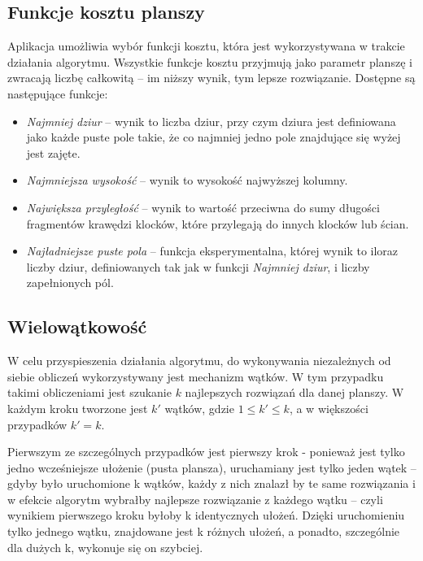 \documentclass{article}
\begin{document}
\subsection{Funkcje kosztu planszy}
Aplikacja umożliwia wybór funkcji kosztu, która jest wykorzystywana w trakcie działania algorytmu. Wszystkie funkcje kosztu przyjmują jako parametr planszę i zwracają liczbę całkowitą -- im niższy wynik, tym lepsze rozwiązanie. Dostępne są następujące funkcje:
\begin{itemize}
\item \textit{Najmniej dziur} -- wynik to liczba dziur, przy czym dziura jest definiowana jako każde puste pole takie, że co najmniej jedno pole znajdujące się wyżej jest zajęte.
\item \textit{Najmniejsza wysokość} -- wynik to wysokość najwyższej kolumny.
\item \textit{Największa przyległość} -- wynik to wartość przeciwna do sumy długości fragmentów krawędzi klocków, które przylegają do innych klocków lub ścian.
\item \textit{Najładniejsze puste pola} -- funkcja eksperymentalna, której wynik to iloraz liczby dziur, definiowanych tak jak w funkcji \textit{Najmniej dziur}, i liczby zapełnionych pól.
\end{itemize}
\subsection{Wielowątkowość}
W celu przyspieszenia działania algorytmu, do wykonywania niezależnych od siebie obliczeń wykorzystywany jest mechanizm wątków. W tym przypadku takimi obliczeniami jest szukanie $k$ najlepszych rozwiązań dla danej planszy. W każdym kroku tworzone jest $k'$ wątków, gdzie $1 \le k' \le k$, a w większości przypadków $k'=k$. 

Pierwszym ze szczególnych przypadków jest pierwszy krok - ponieważ jest tylko jedno wcześniejsze ułożenie (pusta plansza), uruchamiany jest tylko jeden wątek -- gdyby było uruchomione k wątków, każdy z nich znalazł by te same rozwiązania i w efekcie algorytm wybrałby najlepsze rozwiązanie z każdego wątku -- czyli wynikiem pierwszego kroku byłoby k identycznych ułożeń. Dzięki uruchomieniu tylko jednego wątku, znajdowane jest k różnych ułożeń, a ponadto, szczególnie dla dużych k, wykonuje się on szybciej. 
\end{document}
